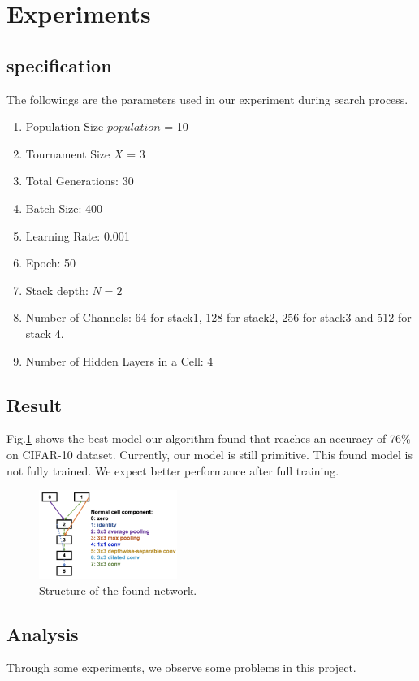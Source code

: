 \documentclass[conference]{IEEEtran}
\begin{document}
\section{Experiments}

\subsection{specification}
The followings are the parameters used in our experiment during search process.
\begin{enumerate}
\item Population Size $population$ = 10
\item Tournament Size $X$ = 3
\item Total Generations: 30
\item Batch Size: 400
\item Learning Rate: 0.001
\item Epoch: 50
\item Stack depth: $N = 2$
\item Number of Channels: 64 for stack1, 128 for stack2, 256 for stack3 and 512 for stack 4.
\item Number of Hidden Layers in a Cell: 4
\end{enumerate}

\subsection{Result}

Fig.\ref{found_artc} shows the best model our algorithm found that reaches an accuracy of 76\% on CIFAR-10 dataset. Currently, our model is still primitive. This found model is not fully trained. We expect better performance after full training.

\begin{figure}[H]
   \centering
   \includegraphics[width=0.4\textwidth]{figures/newResult.png}
 \caption{Structure of the found network. }\label{fig:digit}
 \label{found_artc}
\end{figure}

\subsection{Analysis}
Through some experiments, we observe some problems in this project.
\end{document}
